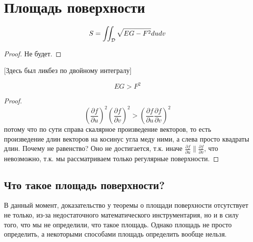 \documentclass[main]{subfiles}
\begin{document}
\chapter{Площадь поверхности}
\begin{theorem}
    \[S = \iint_{\mathcal{D}} \sqrt{EG - F^2} dudv\]
\end{theorem}
\begin{proof}
    Не будет.
\end{proof}
[Здесь был ликбез по двойному интегралу]
\begin{theorem}
    \[EG > F^2\]
\end{theorem}
\begin{proof}
    \[\left( \frac{\partial f}{\partial u}\right)^2 \left( \frac{\partial f}{\partial v}\right)^2 > \left(\frac{\partial f}{\partial u}\frac{\partial f}{\partial v}\right)^2\]
    потому что по сути справа скалярное произведение векторов, то есть произведение длин векторов на косинус угла меду ними, а слева просто квадраты длин.
    Почему не равенство? Оно не достигается, т.к. иначе $\frac{\partial f}{\partial u} \parallel \frac{\partial f}{\partial v}$, что невозможно, т.к. мы рассматриваем только регулярные поверхности.
\end{proof}

\section{Что такое площадь поверхности?}
В данный момент, доказательство у теоремы о площади поверхности отсутствует не только,
из-за недостаточного математического инструментария, но и в силу того, что мы не определили, что такое площадь.
Однако площадь не просто определить, а некоторыми способами площадь определить вообще нельзя.
\end{document}
